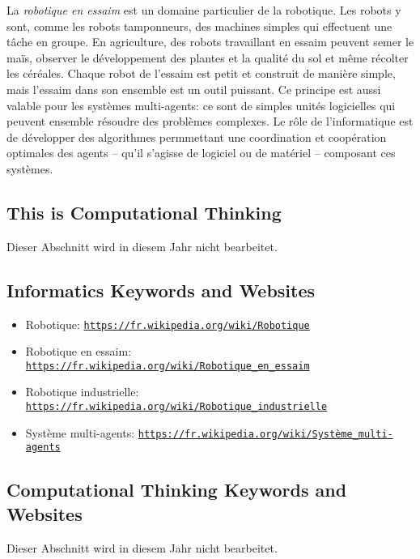 \documentclass[a4paper,11pt]{report}
\newcommand{\BrochureUrlText}[1]{\texttt{#1}}
\begin{document}
La \emph{robotique en essaim} est un domaine particulier de la robotique. Les robots y sont, comme les robots tamponneurs, des machines simples qui effectuent une tâche en groupe. En agriculture, des robots travaillant en essaim peuvent semer le maïs, observer le développement des plantes et la qualité du sol et même récolter les céréales. Chaque robot de l’essaim est petit et construit de manière simple, mais l’essaim dans son ensemble est un outil puissant. Ce principe est aussi valable pour les systèmes multi-agents: ce sont de simples unités logicielles qui peuvent ensemble résoudre des problèmes complexes. Le rôle de l’informatique est de développer des algorithmes permmettant une coordination et coopération optimales des agents – qu’il s’agisse de logiciel ou de matériel – composant ces systèmes.


\subsection*{This is Computational Thinking}

Dieser Abschnitt wird in diesem Jahr nicht bearbeitet.


\subsection*{Informatics Keywords and Websites}

\begin{itemize}
  \item Robotique: \href{https://fr.wikipedia.org/wiki/Robotique}{\BrochureUrlText{https://fr.wikipedia.org/wiki/Robotique}}
  \item Robotique en essaim: \href{https://fr.wikipedia.org/wiki/Robotique_en_essaim}{\BrochureUrlText{https://fr.wikipedia.org/wiki/Robotique\_en\_essaim}}
  \item Robotique industrielle: \href{https://fr.wikipedia.org/wiki/Robotique_industrielle}{\BrochureUrlText{https://fr.wikipedia.org/wiki/Robotique\_industrielle}}
  \item Système multi-agents: \href{https://fr.wikipedia.org/wiki/Syst\%C3\%A8me_multi-agents}{\BrochureUrlText{https://fr.wikipedia.org/wiki/Système\_multi-agents}}
\end{itemize}


\subsection*{Computational Thinking Keywords and Websites}

Dieser Abschnitt wird in diesem Jahr nicht bearbeitet.
\end{document}
